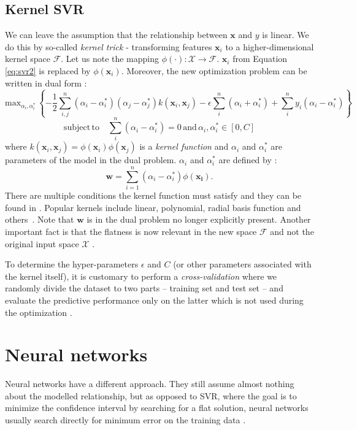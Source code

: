 \subsection*{Kernel SVR}
We can leave the assumption that the relationship between $\bm{x}$ and $y$ is linear. We do this by so-called \textit{kernel trick} - transforming features $\bm{x}_i$ to a higher-dimensional kernel space $\mathcal{F}$. Let us note the mapping $\phi(\cdot): \mathcal{X} \rightarrow \mathcal{F}$. $\bm{x}_i$ from Equation \ref{eq:svr2} is replaced by $\phi(\bm{x}_i)$. Moreover, the new optimization problem can be written in dual form \cite{smola2004}:
\begin{equation}
	\mathrm{max}_{\alpha_i,\alpha_i^*} \, \left\{ -\frac{1}{2}\sum_{i,j}^{n}\left(\alpha_i - \alpha_i^*\right)\left(\alpha_j - \alpha_j^*\right)k(\bm{x}_i,\bm{x}_j) -\epsilon\sum_{i}^{n}\left(\alpha_i + \alpha_i^*\right) + \sum_{i}^{n}y_i\left(\alpha_i - \alpha_i^*\right) \right\}
\end{equation}
\begin{equation}
	\mathrm{subject}\,\mathrm{to}\quad  \sum_{i}^{n}\left(\alpha_i - \alpha_i^*\right) = 0 \,\mathrm{and}\, \alpha_i, \alpha_i^* \in \left[0,C\right]
\end{equation}
where $k(\bm{x}_i,\bm{x}_j) = \phi(\bm{x}_i)\phi(\bm{x}_j)$ is a\textit{ kernel function} and $\alpha_i$ and $\alpha_i^*$ are parameters of the model in the dual problem. $\alpha_i$ and $\alpha_i^*$ are defined by \cite{smola2004}:
\begin{equation}
	\bm{w} = \sum_{i=1}^n(\alpha_i - \alpha_i^*) \phi(\bm{x_i}).
\end{equation}
There are multiple conditions the kernel function must satisfy and they can be found in \cite{smola2004}. Popular kernels include linear, polynomial, radial basis function and others~\cite{zhang2020}. Note that $\bm{w}$ is in the dual problem no longer explicitly present. Another important fact is that the flatness is now relevant in the new space $\mathcal{F}$ and not the original input space $\mathcal{X}$ \cite{smola2004}.

To determine the hyper-parameters $\epsilon$ and $C$ (or other parameters associated with the kernel itself), it is customary to perform a \textit{cross-validation} where we randomly divide the dataset to two parts -- training set and test set -- and evaluate the predictive performance only on the latter which is not used during the optimization \cite{zhang2020}.

\section{Neural networks}
Neural networks have a different approach. They still assume almost nothing about the modelled relationship, but as opposed to SVR, where the goal is to minimize the confidence interval by searching for a flat solution, neural networks usually search directly for minimum error on the training data \cite{vapnik2000}. 

